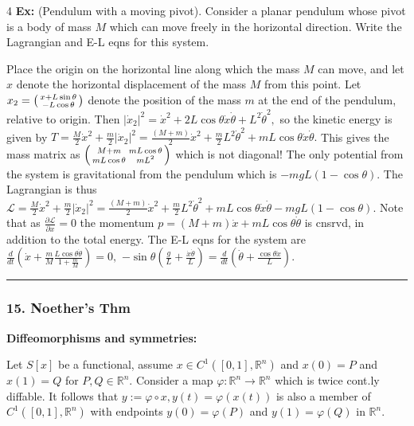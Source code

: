 \documentclass[landscape, 8pt]{extarticle}
\begin{document}
\begin{multicols*}{4}
		\textbf{Ex:} (Pendulum with a moving pivot). Consider a planar pendulum whose pivot is a body of mass $M$ which can move freely in the horizontal direction. Write the Lagrangian and E-L eqns for this system.
		
		Place the origin on the horizontal line along which the mass $M$ can move, and let $x$ denote the horizontal displacement of the mass $M$ from this point. Let
		$
		x_2=\begin{psmallmatrix*}x+L\sin\theta\\-L\cos\theta\end{psmallmatrix*}
		$
		denote the position of the mass $m$ at the end of the pendulum, relative to origin. Then
		$
		|\dot{x}_2|^2=\dot{x}^2+2L\cos\theta\dot{x}\dot\theta+L^2\dot\theta^2,
		$
		so the kinetic energy is given by
		$
		T=\frac{M}{2}\dot{x}^2+\frac{m}{2}|\dot{x}_2|^2=\frac{(M+m)}{2}\dot{x}^2+\frac{m}{2}L^2\dot\theta^2+mL\cos\theta\dot{x}\dot\theta.
		$
		This gives the mass matrix as
		$
		\begin{psmallmatrix*}M+m & mL\cos\theta\\ mL\cos\theta & mL^2\end{psmallmatrix*}
		$
		which is not diagonal! The only potential from the system is gravitational from the pendulum which is $-mgL(1-\cos\theta)$. The Lagrangian is thus
		$
		\mathcal{L}=\frac{M}{2}\dot{x}^2+\frac{m}{2}|\dot{x}_2|^2=\frac{(M+m)}{2}\dot{x}^2+\frac{m}{2}L^2\dot\theta^2+mL\cos\theta\dot{x}\dot\theta
		-mgL(1-\cos\theta).
		$
		Note that as $\frac{\partial\mathcal{L}}{\partial x}=0$ the momentum
		$
		p=(M+m)\dot{x}+mL\cos\theta\dot\theta
		$
		is cnsrvd, in addition to the total energy. The E-L eqns for the system are
		$
		\frac{d}{dt}\left(\dot{x}+\frac{m}{M}\frac{L\cos\theta\dot\theta}{1+\frac{m}{M}}\right)=0,
		$
		$
		-\sin\theta\left(\frac{g}{L}+\frac{\dot{x}\dot\theta}{L}\right)=\frac{d}{dt}\left(\dot\theta+\frac{\cos\theta\dot{x}}{L}\right).
		$
		
		\hrule
		\vspace*{-3pt}
		\subsubsection*{\tiny{15. Noether's Thm}}
		\vspace*{-5pt}
		
		\textbf{Diffeomorphisms and symmetries:}
		
		Let $S[x]$ be a functional, assume $x\in C^1([0,1],\mathbb{R}^n)$ and $x(0)=P$ and $x(1)=Q$ for $P,Q\in\mathbb{R}^n$. Consider a map $\varphi:\mathbb{R}^n\to\mathbb{R}^n$ which is twice cont.ly diffable. It follows that
		$
		y:=\varphi\circ x, y(t)=\varphi(x(t))
		$
		is also a member of $C^1([0,1],\mathbb{R}^n)$ with endpoints $y(0)=\varphi(P)$ and $y(1)=\varphi(Q)$ in $\mathbb{R}^n$.
		

\end{multicols*}
\end{document}
